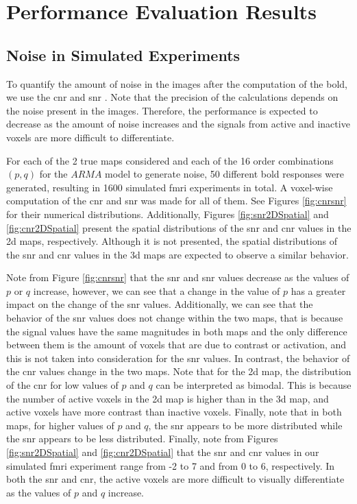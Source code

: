 \chapter{Performance Evaluation Results}

\section{Noise in Simulated Experiments}

To quantify the amount of noise in the images after the computation of the \gls{bold}, we use the
\gls{cnr} and \gls{snr} \cite{welvaert2013definition}. Note that the precision of the calculations 
depends on the noise present in the images. Therefore, the performance is expected to decrease as the 
amount of noise increases and the signals from active and inactive voxels are more difficult to 
differentiate.

For each of the 2 true maps considered and each of the 16 order combinations $(p,q)$ for the 
$ARMA$ model to generate noise, 50 different \gls{bold} responses were generated, resulting in 
1600 simulated \gls{fmri} experiments in total. A voxel-wise computation of the \gls{cnr} and 
\gls{snr} was made for all of them. See Figures \ref{fig:cnrsnr} for their numerical distributions. 
Additionally, Figures \ref{fig:snr2DSpatial} and \ref{fig:cnr2DSpatial} present the spatial distributions 
of the \gls{snr} and \gls{cnr} values in the \gls{2d} maps, respectively. Although it is not presented, 
the spatial distributions of the \gls{snr} and \gls{cnr} values in the \gls{3d} maps are expected to 
observe a similar behavior.

Note from Figure \ref{fig:cnrsnr} that the \gls{snr} and \gls{snr} values decrease as the values of 
$p$ or $q$ increase, however, we can see that a change in the value of $p$ has a greater impact on 
the change of the \gls{snr} values. Additionally, we can see that the behavior of the \gls{snr} values 
does not change within the two maps, that is because the signal values have the same magnitudes in both 
maps and the only difference between them is the amount of voxels that are due to contrast or activation, 
and this is not taken into consideration for the \gls{snr} values. In contrast, the behavior of 
the \gls{cnr} values change in the two maps. Note that for the \gls{2d} map, the distribution 
of the \gls{cnr} for low values of $p$ and $q$ can be interpreted as bimodal. This is because the 
number of active voxels in the \gls{2d} map is higher than in the \gls{3d} map, and 
active voxels have more contrast than inactive voxels. Finally, note that in both maps, 
for higher values of $p$ and $q$, the \gls{snr} appears to be more distributed 
while the \gls{snr} appears to be less distributed. Finally, note from Figures \ref{fig:snr2DSpatial} 
and \ref{fig:cnr2DSpatial} that the \gls{snr} and \gls{cnr} values in our simulated 
\gls{fmri} experiment range from -2 to 7 and from 0 to 6, respectively. In both the 
\gls{snr} and \gls{cnr}, the active voxels are more difficult to visually differentiate as the values 
of $p$ and $q$ increase.

